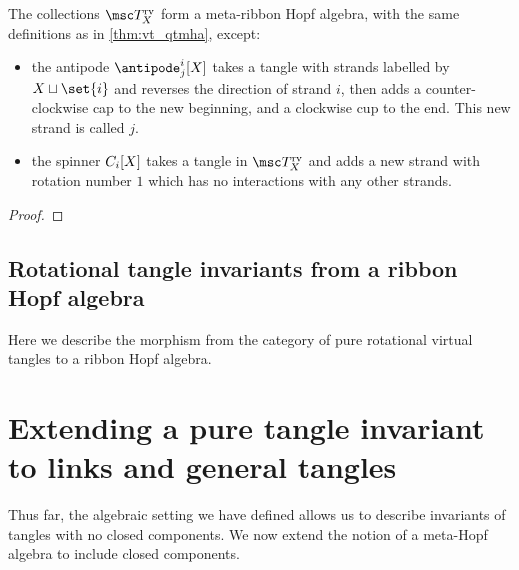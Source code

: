 \documentclass{article}
\begin{document}
\begin{theorem}
        The collections $\RVT_X$ form a meta-ribbon Hopf algebra, with the same
        definitions as in \cref{thm:vt_qtmha}, except:
        \begin{itemize}
                \item the antipode $\antipode^{i}_{j}[X]$ takes a tangle with
                        strands labelled by $X \sqcup \set{i}$ and reverses the
                        direction of strand $i$, then adds a counter-clockwise
                        cap to the new beginning, and a clockwise cup to the
                        end. This new strand is called $j$.
                \item the spinner $C_i[X]$ takes a tangle in $\RVT_X$ and
                        adds a new strand with rotation number $1$ which has no
                        interactions with any other strands.
        \end{itemize}
\end{theorem}
\begin{proof}
\end{proof}

\subsection{Rotational tangle invariants from a ribbon Hopf algebra}
Here we describe the morphism from the category of pure rotational virtual
tangles to a ribbon Hopf algebra.

\section{Extending a pure tangle invariant to links and general tangles}
Thus far, the algebraic setting we have defined allows us to describe invariants
of tangles with no closed components. We now extend the notion of a meta-Hopf
algebra to include closed components.
\end{document}
